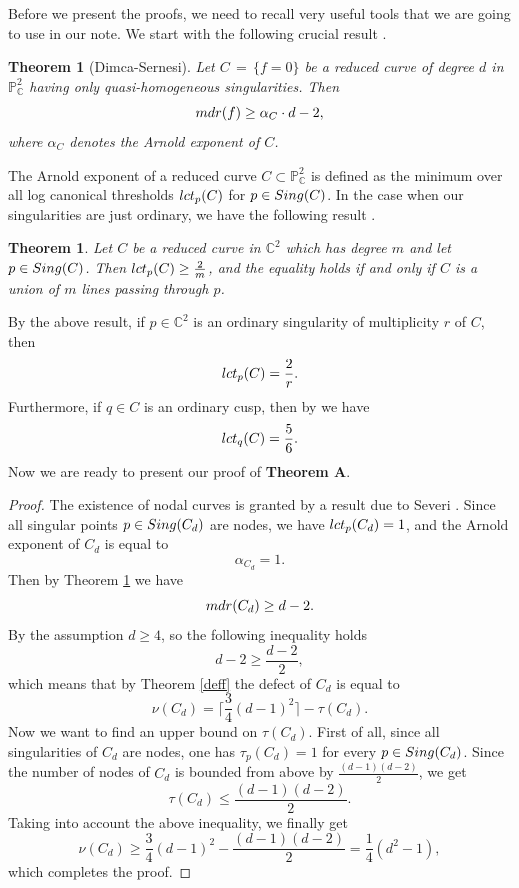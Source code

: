 \documentclass[12pt]{article}
\theoremstyle{plain}
\newtheorem{theorem}[thm]{Theorem}
\theoremstyle{definition}
\begin{document}
Before we present the proofs, we need to recall very useful tools that we are going to use in our note. We start with the following crucial result \cite[Theorem 2.1]{DimcaSernesi}.
\begin{theorem}[Dimca-Sernesi]
\label{sern}
Let $C \, = \, \{ f=0 \}$ be a reduced curve of degree $d$ in $\mathbb{P}^{2}_{\mathbb{C}}$ having only quasi-homogeneous singularities. Then $${\rm mdr}(f) \geq \alpha_{C}\cdot d - 2,$$
where $\alpha_{C}$ denotes the Arnold exponent of $C$.
\end{theorem}
The Arnold exponent of a reduced curve $C \subset \mathbb{P}^{2}_{\mathbb{C}}$ is defined as the minimum over all log canonical thresholds ${\rm lct}_{p}(C)$ for $p \in {\rm Sing}(C)$. In the case when our singularities are just ordinary, we have the following result \cite[Theorem 1.3]{Cheltsov}. 
\begin{theorem}
Let $C$ be a reduced curve in $\mathbb{C}^{2}$ which has degree $m$ and let $p \in {\rm Sing}(C)$. Then ${\rm lct}_{p}(C) \geq \frac{2}{m}$, and the equality holds if and only if $C$ is a union of $m$ lines passing through $p$.
\end{theorem}
\noindent
By the above result, if $p \in \mathbb{C}^{2}$ is an ordinary singularity of multiplicity $r$ of $C$, then 
\begin{equation}
{\rm lct}_{p}(C) = \frac{2}{r}.
\end{equation}
Furthermore, if $q \in C$ is an ordinary cusp, then by \cite[Example 1.5]{Cheltsov} we have
\begin{equation}
{\rm lct}_{q}(C) = \frac{5}{6}.  
\end{equation}
Now we are ready to present our proof of \textbf{Theorem A}.
\begin{proof}
 The existence of nodal curves is granted by a result due to Severi \cite{Severi}. Since all singular points $p \in {\rm Sing}(C_{d})$ are nodes, we have ${\rm lct}_{p}(C_{d}) =1$, and the Arnold exponent of $C_{d}$ is equal to
 $$\alpha_{C_{d}} = 1.$$
 Then by Theorem \ref{sern} we have
 $${\rm mdr}(C_{d}) \geq d-2.$$
 By the assumption $d\geq 4$, so the following inequality holds
 $$d - 2 \geq \frac{d-2}{2},$$
 which means that by Theorem \ref{deff} the defect of $C_{d}$ is equal to 
 $$\nu(C_{d}) = \bigg\lceil\frac{3}{4}(d-1)^{2}\bigg\rceil - \tau(C_{d}).$$
 Now we want to find an upper bound on $\tau(C_{d})$. First of all, since all singularities of $C_{d}$ are nodes, one has $\tau_{p}(C_{d}) = 1$ for every $p \in {\rm Sing}(C_{d})$. Since the number of nodes of $C_{d}$ is bounded from above by $\frac{(d-1)(d-2)}{2}$, we get
 $$\tau(C_{d}) \leq \frac{(d-1)(d-2)}{2}.$$
 Taking into account the above inequality, we finally get 
 $$\nu(C_{d}) \geq \frac{3}{4}(d-1)^{2} - \frac{(d-1)(d-2)}{2} = \frac{1}{4}(d^{2}-1),$$
 which completes the proof.
\end{proof}
\end{document}

